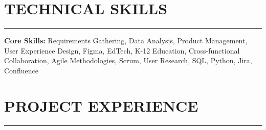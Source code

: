\documentclass[10pt,letterpaper]{article}
\newcommand{\sectionline}{\par\vspace{-0.5em}\noindent\rule{\textwidth}{0.6pt}\vspace{0.3em}\par}
\begin{document}
\section*{TECHNICAL SKILLS}
\sectionline

\noindent\textbf{Core Skills:} Requirements Gathering, Data Analysis, Product Management, User Experience Design, Figma, EdTech, K-12 Education, Cross-functional Collaboration, Agile Methodologies, Scrum, User Research, SQL, Python, Jira, Confluence

\section*{PROJECT EXPERIENCE}
\sectionline

\begin{itemize}
\end{itemize}
\end{document}
